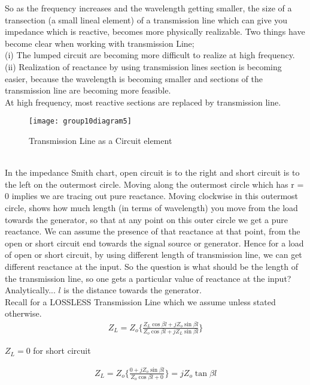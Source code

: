 So as the frequency increases and the wavelength getting smaller, the size of a transection (a small lineal element) of a transmission line which can give you impedance which is reactive, becomes more physically realizable.
Two things have become clear when working with transmission
Line;
\\(i) The lumped circuit are becoming more difficult to realize at high frequency.
\\(ii) Realization of reactance by using transmission lines section is becoming easier, because the wavelength is becoming smaller and sections of the transmission line are becoming more feasible.\\
At high frequency, most reactive sections are replaced by transmission line.
\begin{figure}[h]
	\centering
	\texttt{[image: group10diagram5]}
	\caption{Transmission Line as a Circuit element}
\end{figure}
\\In the impedance Smith chart, open circuit is to the right and
short circuit is to the left on the outermost circle. Moving along
the outermost circle which has r = 0 implies we are tracing
out pure reactance. Moving clockwise in this outermost circle,
shows how much length (in terms of wavelength) you move from
the load towards the generator, so that at any point on this outer
circle we get a pure reactance. We can assume the presence of
that reactance at that point, from the open or short circuit end
towards the signal source or generator.
Hence for a load of open or short circuit, by using different length of transmission line, we can get different reactance at the input. So the question is what should be the length of the transmission line, so one gets a particular value of reactance at the input?\\
Analytically...
$ l $ is the distance towards the generator.\\ Recall for a LOSSLESS Transmission Line which we assume unless stated otherwise.
\begin{align*}
Z_{L} = Z_o \{ \frac{Z_{L}\cos\beta l + jZ_o\sin\beta l}{Z_o\cos\beta l + jZ_{L}\sin\beta l}\}  
\end{align*}
\begin{center}
	$Z_{L} = 0$ for short circuit 
\end{center}
\begin{align}
Z_{L} = Z_o \{ \frac{0 + jZ_o\sin\beta l}{Z_o\cos\beta l + 0}\}  = jZ_o\tan\beta l
\end{align}
